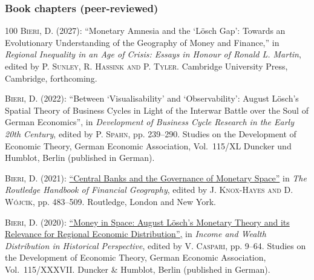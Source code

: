 \documentclass[letter,11pt]{article}
\begin{document}
\subsubsection*{Book chapters (peer-reviewed)}
\begingroup
\renewcommand{\section}[2]{}
\begin{thebibliography}{100}
\textsc{Bieri, D.} (2027): \enquote{Monetary Amnesia and the \enquote{L\"{o}sch Gap}: Towards an Evolutionary Understanding of the Geography of Money and Finance,} in \emph{Regional Inequality in an Age of Crisis: Essays in Honour of Ronald L. Martin}, edited by \textsc{P. Sunley, R. Hassink {\small and} P. Tyler}. Cambridge University Press, Cambridge, forthcoming.

\textsc{Bieri, D.} (2022): \enquote{Between \enquote{Visualisability} and \enquote{Observability}: August L\"{o}sch's Spatial Theory of Business Cycles in Light of the Interwar Battle over the Soul of German Economics}, in \emph{Development of Business Cycle Research in the Early 20th Century}, edited by \textsc{P. Spahn}, pp. 239--290. Studies on the Development of Economic Theory, German Economic Association, Vol.~115/XL Duncker und Humblot, Berlin (published in German).


\textsc{Bieri, D.} (2021):  \href{https://www.taylorfrancis.com/chapters/edit/10.4324/9781351119061-27/central-banks-governance-monetary-space-david-bieri}{\enquote{Central Banks and the Governance of Monetary Space}} in \emph{The Routledge Handbook of Financial Geography}, edited by \textsc{J. Knox-Hayes and D. W\'{o}jcik}, pp. 483--509. Routledge, London and New York.

\textsc{Bieri, D.} (2020): \href{https://www.jstor.org/stable/j.ctv24q548f?}{\enquote{Money in Space: August L\"{o}sch's Monetary Theory and its Relevance for Regional Economic Distribution},} in \emph{Income and Wealth Distribution in Historical Perspective}, edited by \textsc{V. Caspari}, pp. 9--64. Studies on the Development of Economic Theory, German Economic Association, Vol.~115/XXXVII. Duncker \& Humblot, Berlin (published in German).


\end{thebibliography}
\end{document}
